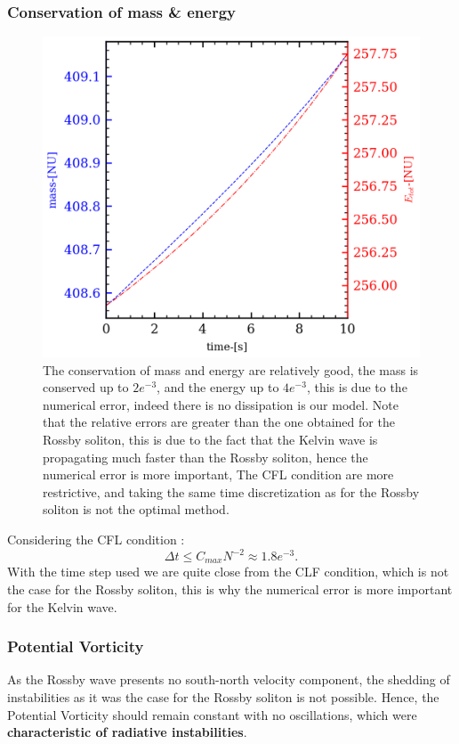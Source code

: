 \documentclass[11pt,a4paper]{report}
\begin{document}
\begin{multicols}{2}

    \subsubsection{Conservation of mass \& energy}
    \begin{figure}[H]
        \centering
        \includegraphics[width=\linewidth]{./figure/energy_kelvin_wave.png}
        \caption{The conservation of mass and energy are relatively good, the mass is conserved up to $2e^{-3}$, and the energy up to $4e^{-3}$, this is due to the numerical error, indeed there is no dissipation is our model. Note that the relative errors are greater than the one obtained for the Rossby soliton, this is due to the fact that the Kelvin wave is propagating much faster than the Rossby soliton, hence the numerical error is more important, The CFL condition are more restrictive, and taking the same time discretization as for the Rossby soliton is not the optimal method.}
        \label{}
    \end{figure}
    Considering the CFL condition :$$\Delta t \le  C_{max} N^{-2} \approx 1.8e^{-3}.$$ With the time step used we are quite close from the CLF condition, which is not the case for the Rossby soliton, this is why the numerical error is more important for the Kelvin wave.
    \subsubsection{Potential Vorticity}
    As the Rossby wave presents no south-north velocity component, the shedding of instabilities as it was the case for the Rossby soliton is not possible. Hence, the Potential Vorticity should remain constant with no oscillations, which were \textbf{characteristic of radiative instabilities}.


\end{multicols}
\end{document}
